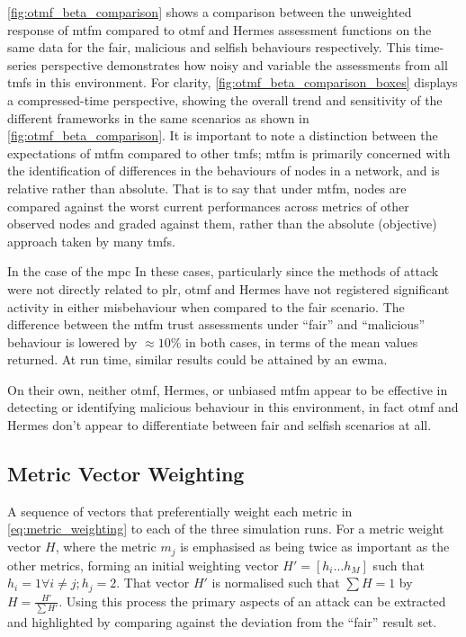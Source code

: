 \autoref{fig:otmf_beta_comparison} shows a comparison between the unweighted response of \gls{mtfm} compared to \gls{otmf} and Hermes assessment functions on the same data for the fair, malicious and selfish behaviours respectively.
This time-series perspective demonstrates how noisy and variable the assessments from all \glspl{tmf} in this environment.
For clarity, \autoref{fig:otmf_beta_comparison_boxes} displays a compressed-time perspective, showing the overall trend and sensitivity of the different frameworks in the same scenarios as shown in \autoref{fig:otmf_beta_comparison}.
It is important to note a distinction between the expectations of \gls{mtfm} compared to other \glspl{tmf}; \gls{mtfm} is primarily concerned with the identification of differences in the behaviours of nodes in a network, and is relative rather than absolute.
That is to say that under \gls{mtfm}, nodes are compared against the worst current performances across metrics of other observed nodes and graded against them, rather than the absolute (objective) approach taken by many \glspl{tmf}.

In the case of the \gls{mpc}
In these cases, particularly since the methods of attack were not directly related to \gls{plr}, \gls{otmf} and Hermes have not registered significant activity in either misbehaviour when compared to the fair scenario.
The difference between the \gls{mtfm} trust assessments under ``fair'' and ``malicious'' behaviour is lowered by $\approx 10\%$ in both cases, in terms of the mean values returned.
At run time, similar results could be attained by an \gls{ewma}.

On their own, neither \gls{otmf}, Hermes, or unbiased \gls{mtfm} appear to be effective in detecting or identifying malicious behaviour in this environment, in fact \gls{otmf} and Hermes don't appear to differentiate between fair and selfish scenarios at all.



\subsection{Metric Vector Weighting}\label{sec:metric_weighting}
%

A sequence of vectors that preferentially weight each metric in \eqref{eq:metric_weighting} to each of the three simulation runs.
For a metric weight vector $H$, where the metric $m_j$ is emphasised as being twice as important as the other metrics, forming an initial weighting vector $H'=[h_i\dots h_M]$ such that $h_i = 1 \forall i \ne j; h_j=2$.
That vector $H'$ is normalised such that $\sum H = 1$ by $H= \frac{H'}{\sum H'}$.
Using this process the primary aspects of an attack can be extracted and highlighted by comparing against the deviation from the ``fair'' result set. 

